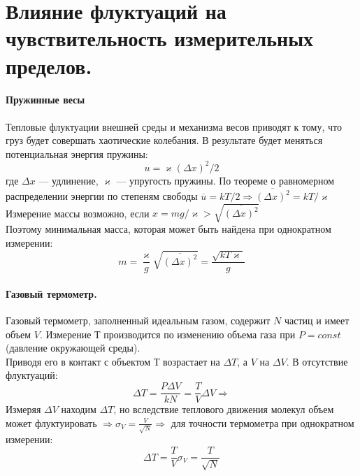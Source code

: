 \section{\normalsize Влияние флуктуаций на чувствительность измерительных пределов.}
\paragraph{Пружинные весы} Тепловые флуктуации внешней среды и механизма весов приводят к тому, что груз будет совершать хаотические колебания. В результате будет меняться потенциальная энергия пружины:
\[ u=\varkappa(\Delta x)^2/2 \]
где $\Delta x$ --- удлинение, $\varkappa$ --- упругость пружины.
По теореме о равномерном распределении энергии по степеням свободы $\overline{u}=kT/2\Rightarrow\overline{(\Delta x)^2}=kT/\varkappa$\\
Измерение массы возможно, если $x=mg/\varkappa>\sqrt{\overline{(\Delta x)^2}}$\\
Поэтому минимальная масса, которая может быть найдена при однократном измерении:
\[m=\frac{\varkappa}{g}\sqrt{\overline{(\Delta x)^2}}=\frac{\sqrt{kT\varkappa}}{g}\]
\paragraph{Газовый термометр.} Газовый термометр, заполненный идеальным газом, содержит $N$ частиц и имеет объем $V$. Измерение $Т$ производится по изменению объема газа при $P = const$ (давление окружающей среды).\\
Приводя его в контакт с объектом $Т$ возрастает на $\Delta T$, а $V$ на $\Delta V$. В отсутствие флуктуаций: 
\[
\Delta T=\frac{P \Delta V}{kN}=\frac{T}{V}\Delta V \Rightarrow
\]
Измеряя $\Delta V$ находим $\Delta T$, но вследствие теплового движения молекул объем может флуктуировать $\Rightarrow \sigma_V=\frac{V}{\sqrt{N}} \Rightarrow$ для точности термометра при однократном измерении:
\[
\Delta T=\frac{T}{V}\sigma_V=\frac{T}{\sqrt{N}}
\]